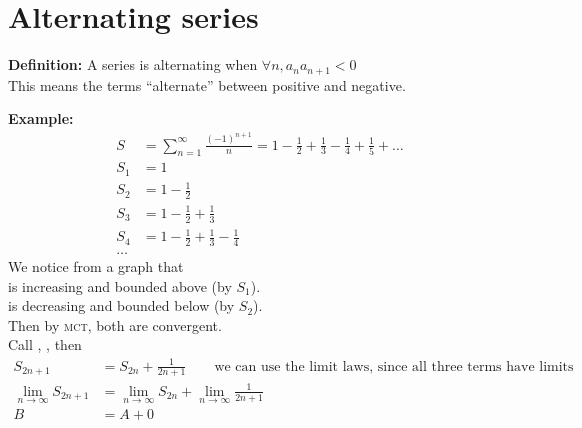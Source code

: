 \section{Alternating series}
\textbf{Definition:} A series  is alternating when \(\forall n, a_n a_{n+1} < 0\)\\ This means the terms ``alternate'' between positive and negative.

\textbf{Example:} \begin{align*}
  S   & = \sum_{n = 1}^{\infty} \frac{(-1)^{n+1}}{n} = 1 - \frac{1}{2} + \frac{1}{3} - \frac{1}{4} + \frac{1}{5} + \dots \\
  S_1 & = 1                                                                                                              \\
  S_2 & = 1 - \frac{1}{2}                                                                                                \\
  S_3 & = 1 - \frac{1}{2} + \frac{1}{3}                                                                                  \\
  S_4 & = 1 - \frac{1}{2} + \frac{1}{3} - \frac{1}{4}                                                                    \\
  \dots
\end{align*}
We notice from a graph that \\
 is increasing and bounded above (by \(S_1\)).\\
 is decreasing and bounded below (by \(S_2\)). \\
Then by \textsc{mct}, both are convergent. \\
Call , , then \\
\begin{align*}
  S_{2n+1}                    & = S_{2n} + \frac{1}{2n+1} \qquad \text{we can use the limit laws, since all three terms have limits} \\
  \lim_{n\to\infty}  S_{2n+1} & =\lim_{n\to\infty} S_{2n} +\lim_{n\to\infty} \frac{1}{2n+1}                                          \\
  B                           & = A + 0
\end{align*}


